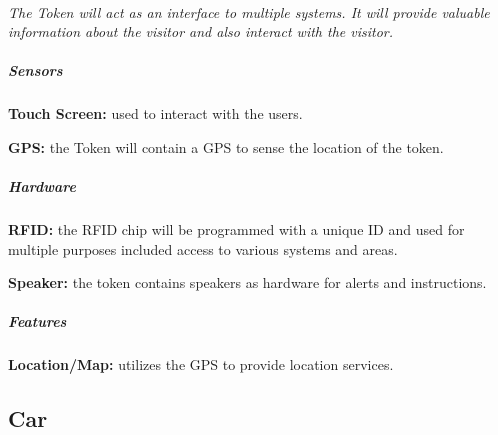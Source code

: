 \documentclass[12pt]{article}
\begin{document}
	\paragraph{} \textit{The Token will act as an interface to multiple systems. It will provide valuable information about the visitor and also interact with the visitor. }
		\subparagraph{Sensors}
			\begin{list}{}{}
					\item \textbf{Touch Screen: }used to interact with the users. 
					\item \textbf{GPS: }the Token will contain a GPS to sense the location of the token.
 
			\end{list}
		\subparagraph{Hardware}
			\begin{list}{}{}
					\item \textbf{RFID: }the RFID chip will be programmed with a unique ID and used for multiple purposes included access to various systems and areas.
					\item \textbf{Speaker: }the token contains speakers as hardware for alerts and instructions.
			\end{list}
		\subparagraph{Features}
			\begin{list}{}{}
					\item \textbf{Location/Map: }utilizes the GPS to provide location services.
			\end{list}

\subsection{Car}
\end{document}
